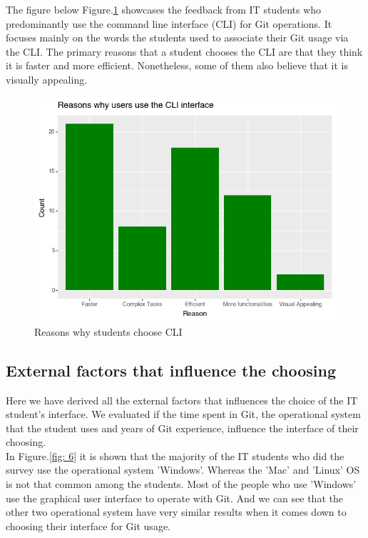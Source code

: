 \documentclass[]{report}
\begin{document}
	The figure below Figure.\ref{fig: 5} showcases the feedback from IT students who predominantly use the command line interface (CLI) for Git operations. It focuses mainly on the words the students used to associate their Git usage via the CLI. The primary reasons that a student chooses the CLI are that they think it is faster and more efficient. Nonetheless, some of them also believe that it is visually appealing.
	
	\begin{figure}[H]
		\centering
		\includegraphics[width=0.75\linewidth]{ReasonsCLI}
		\caption{Reasons why students choose CLI}
		\label{fig: 5}
	\end{figure}

	\subsection{External factors that influence the choosing }
	Here we have derived all the external factors that influences the choice of the IT student's interface.  We evaluated if the time spent in Git, the operational system that the student uses and years of Git experience, influence the interface of their choosing.\\
	
	In Figure.\ref{fig: 6} it is shown that the majority of the IT students who did the survey use the operational system 'Windows'. Whereas the 'Mac' and 'Linux' OS is not that common among the students. Most of the people who use 'Windows' use the graphical user interface to operate with Git. And we can see that the other two operational system have very similar results when it comes down to choosing their interface for Git usage.
	
\end{document}
